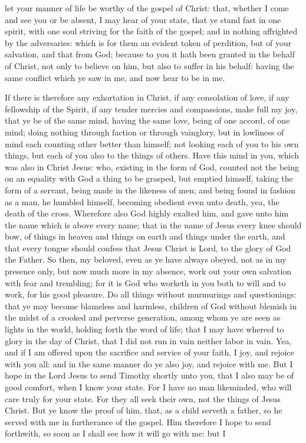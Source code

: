 let your manner of life be worthy of the gospel of Christ: that, whether I come and see you or be absent, I may hear of your state, that ye stand fast in one spirit, with one soul striving for the faith of the gospel; and in nothing affrighted by the adversaries: which is for them an evident token of perdition, but of your salvation, and that from God; because to you it hath been granted in the behalf of Christ, not only to believe on him, but also to suffer in his behalf: having the same conflict which ye saw in me, and now hear to be in me. 

If there is therefore any exhortation in Christ, if any consolation of love, if any fellowship of the Spirit, if any tender mercies and compassions, make full my joy, that ye be of the same mind, having the same love, being of one accord, of one mind; doing nothing through faction or through vainglory, but in lowliness of mind each counting other better than himself; not looking each of you to his own things, but each of you also to the things of others. Have this mind in you, which was also in Christ Jesus: who, existing in the form of God, counted not the being on an equality with God a thing to be grasped, but emptied himself, taking the form of a servant, being made in the likeness of men; and being found in fashion as a man, he humbled himself, becoming obedient even unto death, yea, the death of the cross. Wherefore also God highly exalted him, and gave unto him the name which is above every name; that in the name of Jesus every knee should bow, of things in heaven and things on earth and things under the earth, and that every tongue should confess that Jesus Christ is Lord, to the glory of God the Father.  So then, my beloved, even as ye have always obeyed, not as in my presence only, but now much more in my absence, work out your own salvation with fear and trembling; for it is God who worketh in you both to will and to work, for his good pleasure. Do all things without murmurings and questionings: that ye may become blameless and harmless, children of God without blemish in the midst of a crooked and perverse generation, among whom ye are seen as lights in the world, holding forth the word of life; that I may have whereof to glory in the day of Christ, that I did not run in vain neither labor in vain. Yea, and if I am offered upon the sacrifice and service of your faith, I joy, and rejoice with you all: and in the same manner do ye also joy, and rejoice with me.  But I hope in the Lord Jesus to send Timothy shortly unto you, that I also may be of good comfort, when I know your state. For I have no man likeminded, who will care truly for your state. For they all seek their own, not the things of Jesus Christ. But ye know the proof of him, that, as a child serveth a father, so he served with me in furtherance of the gospel. Him therefore I hope to send forthwith, so soon as I shall see how it will go with me: but I 